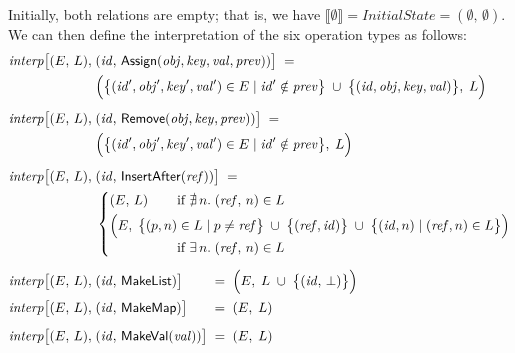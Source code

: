 \noindent
Initially, both relations are empty; that is, we have $\llbracket\emptyset\rrbracket = \mathit{InitialState} = (\emptyset,\, \emptyset)$.
We can then define the interpretation of the six operation types as follows:
\begin{align*}
    \mathit{interp}\big[(E,\, L),\; &(\mathit{id},\, \mathsf{Assign}(\mathit{obj}, \mathit{key}, \mathit{val}, \mathit{prev})) \big] \;=\\
    &\Big( \big\{ (\mathit{id}', \mathit{obj}', \mathit{key}', \mathit{val}') \in E \mid
    \mathit{id}' \notin \mathit{prev} \big\} \;\cup\;
    \big\{ (\mathit{id}, \mathit{obj}, \mathit{key}, \mathit{val}) \big\},\; L \Big) \\[5pt]
    \mathit{interp}\big[(E,\, L),\; &(\mathit{id},\, \mathsf{Remove}(\mathit{obj}, \mathit{key}, \mathit{prev})) \big] \;=\\
    &\Big( \big\{ (\mathit{id}', \mathit{obj}', \mathit{key}', \mathit{val}') \in E \mid
    \mathit{id}' \notin \mathit{prev} \big\},\; L \Big) \\[5pt]
    \mathit{interp}\big[(E,\, L),\; &(\mathit{id},\, \mathsf{InsertAfter}(\mathit{ref})) \big] \;=\\
    &\left\{
        \arraycolsep=0pt \def\arraystretch{1.2}
        \begin{array}{ll}
            (E,\, L) & \text{if } \nexists\,n.\; (\mathit{ref},\, n) \in L\\[3pt]
            \Big(E,\; \big\{ (p,n) &\;\in L \mid p \neq \mathit{ref} \big\} \;\cup\;
            \big\{ (\mathit{ref}, \mathit{id}) \big\} \;\cup\;
            \big\{ (\mathit{id}, n) \mid (\mathit{ref}, n) \in L \big\} \Big)\\
            & \text{if } \exists\,n.\; (\mathit{ref},\,n) \in L
        \end{array} \right. \\[5pt]
    \mathit{interp}\big[(E,\, L),\; &(\mathit{id},\, \mathsf{MakeList}) \big] \hspace{21.1pt}=\;
    \Big( E,\; L \;\cup\; \big\{(\mathit{id},\, \bot)\big\}\Big) \\[1pt]
    \mathit{interp}\big[(E,\, L),\; &(\mathit{id},\, \mathsf{MakeMap}) \big] \hspace{17.6pt}=\; (E,\; L) \\[5pt]
    \mathit{interp}\big[(E,\, L),\; &(\mathit{id},\, \mathsf{MakeVal}(\mathit{val})) \big] \;=\; (E,\; L)
\end{align*}

